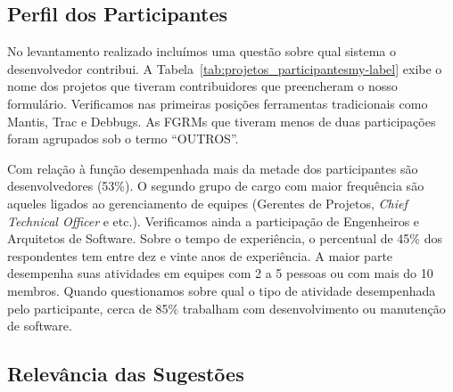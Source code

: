 \subsection{Perfil dos Participantes}
\label{sub:sug_melhorias_resultados_perfil_dos_participantes}

No levantamento realizado incluímos uma questão sobre qual sistema o
desenvolvedor contribui. A Tabela~\ref{tab:projetos_participantesmy-label}
exibe o nome dos projetos que tiveram contribuidores que preencheram o nosso
formulário. Verificamos nas primeiras posições ferramentas tradicionais como
Mantis, Trac e Debbugs. As FGRMs que tiveram menos de duas participações foram
agrupados sob o termo ``OUTROS''.

\begin{table}[htpb]
\centering
{}
\caption{Projetos que os participantes contribuem.}
\label{tab:projetos_participantesmy-label}
\end{table}

Com relação à função desempenhada mais da metade dos participantes são
desenvolvedores (53\%). O segundo grupo de cargo com maior frequência são
aqueles ligados ao gerenciamento de equipes (Gerentes de Projetos,
\textit{Chief Technical Officer} e etc.). Verificamos ainda a participação de
Engenheiros e Arquitetos de Software. Sobre o tempo de experiência, o
percentual de 45\% dos respondentes tem entre dez e vinte anos de experiência.
A maior parte desempenha suas atividades em equipes com 2 a 5 pessoas ou com
mais do 10 membros. Quando questionamos sobre qual o tipo de atividade
desempenhada pelo participante, cerca de 85\% trabalham com desenvolvimento ou
manutenção de software.

\subsection{Relevância das Sugestões}
\label{sub:sug_melhorias_resultados_relevancia}

